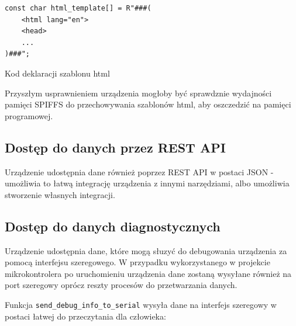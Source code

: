 \documentclass[12pt,a4paper]{article}
\begin{document}
\begin{code}[H]
\begin{verbatim}
const char html_template[] = R"###(
    <html lang="en">
    <head>
    ...
)###";
\end{verbatim}
\caption{Kod deklaracji szablonu html}
\label{html-template-code}
\end{code}

Przyszłym usprawnieniem urządzenia mogłoby być sprawdznie wydajności pamięci SPIFFS do przechowywania szablonów html, aby oszczedzić na pamięci programowej. 

\subsection{Dostęp do danych przez REST API}

Urządzenie udostępnia dane również poprzez REST API w postaci JSON - umożliwia to łatwą integrację urządzenia z innymi narzędziami, 
albo umożliwia stworzenie własnych integracji. 

\subsection{Dostęp do danych diagnostycznych}

Urządzenie udostępnia dane, które mogą słuzyć do debugowania urządzenia za pomocą interfejsu szeregowego. W przypadku wykorzystanego w projekcie
mikrokontrolera po uruchomieniu urządzenia dane zostaną wysyłane również na port szeregowy oprócz reszty procesów do przetwarzania danych.

Funkcja \texttt{send\_debug\_info\_to\_serial} wysyła dane na interfejs szeregowy w postaci łatwej do przeczytania dla człowieka:
\end{document}

